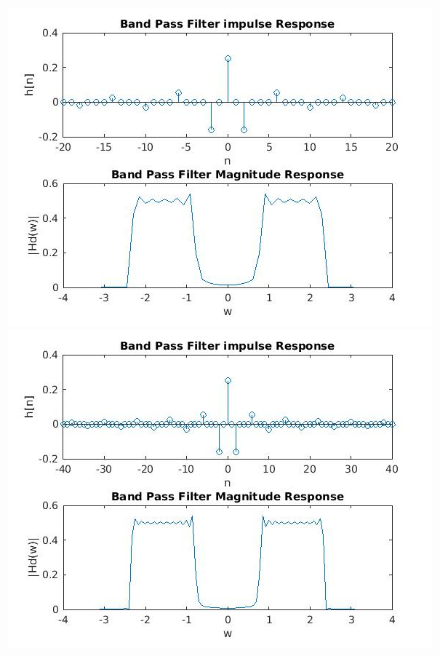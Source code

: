 \documentclass{article}
\begin{document}
\begin{figure}[H]
\includegraphics[scale = .5]{1_bpf_20}
\includegraphics[scale = .5]{1_bpf_40}
\end{figure}
\end{document}
